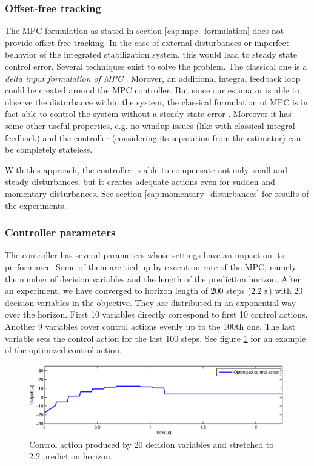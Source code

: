 \subsubsection{Offset-free tracking}
\label{cap:offset_free_tracking}

The MPC formulation as stated in section \ref{cap:mpc_formulation} does not provide offset-free tracking. In the case of external disturbances or imperfect behavior of the integrated stabilization system, this would lead to steady state control error. Several techniques exist to solve the problem. The classical one is a \emph{delta input formulation of MPC} \citep{borrelli2007offsetfree}. Morover, an additional integral feedback loop could be created around the MPC controller. But since our estimator is able to observe the disturbance within the system, the classical formulation of MPC is in fact able to control the system without a steady state error \citep{rossiter2013mpcpracticalapproach}. Moreover it has some other useful properties, e.g. no windup issues (like with classical integral feedback) and the controller (considering its separation from the estimator) can be completely stateless. 

With this approach, the controller is able to compensate not only small and steady disturbances, but it creates adequate actions even for sudden and momentary disturbances. See section \ref{cap:momentary_disturbances} for results of the experiments.

\subsubsection{Controller parameters}
\label{cap:implementation_performance}

The controller has several parameters whose settings have an impact on its performance. Some of them are tied up by execution rate of the MPC, namely the number of decision variables and the length of the prediction horizon.  After an experiment, we have converged to horizon length of 200 steps ($2.2~\mathrm{s}$) with 20 decision variables in the objective. They are distributed in an exponential way over the horizon. First 10 variables directly correspond to first 10 control actions. Another 9 variables cover control actions evenly up to the 100th one. The last variable sets the control action for the last 100 steps. See figure \ref{fig:control_action} for an example of the optimized control action.

\begin{figure}[H]
\centering
\includegraphics[width=0.99\textwidth]{fig/control_action.eps}
\caption{Control action produced by 20 decision variables and stretched to 2.2 prediction horizon.}
\label{fig:control_action}
\end{figure}

